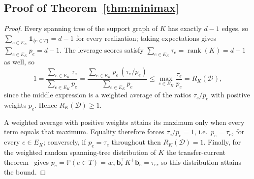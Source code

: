 \documentclass{article}
\newcommand{\1}{\mathbbm{1}}
\theoremstyle{plain}
\renewcommand{\Pr}[1]{\mathbb{P}\left(#1\right)}
\begin{document}
\subsection{Proof of Theorem~\ref{thm:minimax}}
\label{app:minimax}
\begin{proof}
Every spanning tree of the support graph of $K$ has exactly $d-1$
edges, so $\sum_{e\in E_K}\mathbf 1_{\{e\in T\}}=d-1$ for every
realization; taking expectations gives $\sum_{e\in E_K}p_e=d-1$. The
leverage scores satisfy $\sum_{e\in E_K}\tau_e=\operatorname{rank}(K)=d-1$
as well, so
\[
1=\frac{\sum_{e\in E_K}\tau_e}{\sum_{e\in E_K}p_e}
 =\frac{\sum_{e\in E_K}p_e\,(\tau_e/p_e)}{\sum_{e\in E_K}p_e}
 \leq \max_{e\in E_K}\frac{\tau_e}{p_e}=R_K(\mathcal D),
\]
since the middle expression is a weighted average of the ratios
$\tau_e/p_e$ with positive weights $p_e$. Hence
$R_K(\mathcal D)\geq 1$.

A weighted average with positive weights attains its maximum only when
every term equals that maximum. Equality therefore forces
$\tau_e/p_e=1$, i.e.\ $p_e=\tau_e$, for every $e\in E_K$; conversely,
if $p_e=\tau_e$ throughout then $R_K(\mathcal D)=1$. Finally, for the
weighted random spanning-tree distribution of $K$ the transfer-current
theorem~\cite{lyons2003determinantal} gives
$p_e=\Pr{e\in T}=w_e\,\mathbf b_e^\top K^{+}\mathbf b_e=\tau_e$, so
this distribution attains the bound.
\end{proof}
\end{document}

